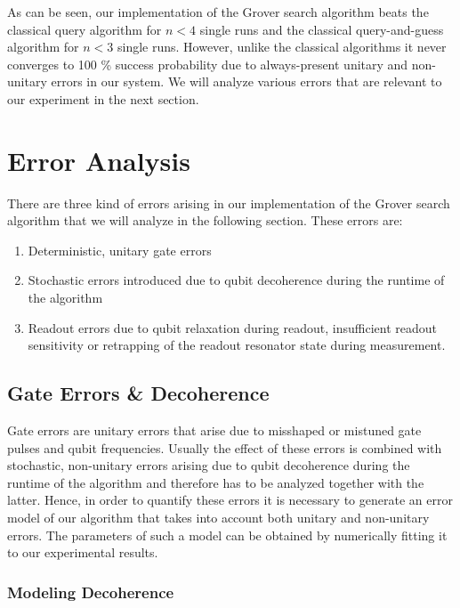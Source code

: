 As can be seen, our implementation of the Grover search algorithm beats the classical query algorithm for $n<4$ single runs and the classical query-and-guess algorithm for $n<3$ single runs. However, unlike the classical algorithms it never converges to 100 \% success probability due to always-present unitary and non-unitary errors in our system. We will analyze various errors that are relevant to our experiment in the next section.

\section{Error Analysis}

There are three kind of errors arising in our implementation of the Grover search algorithm that we will analyze in the following section. These errors are:

\begin{enumerate}
	\item Deterministic, unitary gate errors
	\item Stochastic errors introduced due to qubit decoherence during the runtime of the algorithm
	\item Readout errors due to qubit relaxation during readout, insufficient readout sensitivity or retrapping of the readout resonator state during measurement.
\end{enumerate}

\subsection{Gate Errors \& Decoherence}

Gate errors are unitary errors that arise due to misshaped or mistuned gate pulses and qubit frequencies. Usually the effect of these errors is combined with stochastic, non-unitary errors arising due to qubit decoherence during the runtime of the algorithm and therefore has to be analyzed together with the latter. Hence, in order to quantify these errors it is necessary to generate an error model of our algorithm that takes into account both unitary and non-unitary errors. The parameters of such a model can be obtained by numerically fitting it to our experimental results. 

\subsubsection{Modeling Decoherence}

